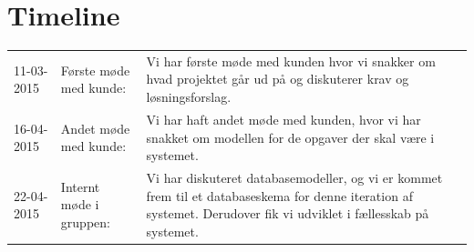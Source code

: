 \documentclass[12pt]{article}
\begin{document}
\section{Timeline}
\begin{tabular}{l l p{8cm}}
11-03-2015 & Første møde med kunde: & Vi har første møde med kunden hvor vi snakker om hvad projektet går ud på og diskuterer krav og løsningsforslag. \\
16-04-2015 & Andet møde med kunde: & Vi har haft andet møde med kunden, hvor vi har snakket om modellen for de opgaver der skal være i systemet. \\
22-04-2015 & Internt møde i gruppen: & Vi har diskuteret databasemodeller, og vi er kommet frem til et databaseskema for denne iteration af systemet. Derudover fik vi udviklet i fællesskab på systemet. \\
\end{tabular}


{}
\end{document}

